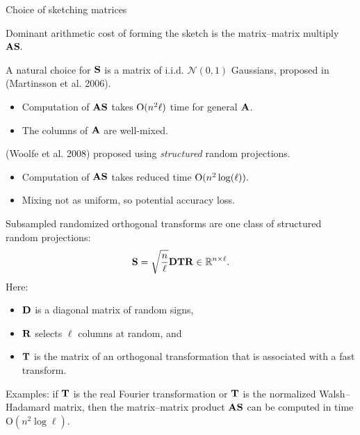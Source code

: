 \documentclass[xcolor=x11names,compress,ignorenonframetext,10pt]{beamer}
\renewcommand{\(}{\begin{columns}}
\renewcommand{\)}{\end{columns}}
\newcommand{\<}[1]{\begin{column}{#1}}
\renewcommand{\>}{\end{column}}
\def\refcolor{DodgerBlue4}
\newcommand{\refer}[1]{({\color{\refcolor}#1})}
\begin{document}
\begin{frame}{Choice of sketching matrices}

Dominant arithmetic cost of forming the sketch is the matrix--matrix multiply $\mathbf{A}\mathbf{S}.$
\vspace{1em}

A natural choice for $\mathbf{S}$ is a matrix of i.i.d. $\mathcal{N}(0,1)$ Gaussians, proposed in \refer{Martinsson et al. 2006}. 
\begin{itemize}
 \item Computation of 
$\mathbf{A} \mathbf{S}$ takes $\mathrm{O}(n^2\ell)$ time for general $\mathbf{A}$.
 \item The columns of $\mathbf{A}$ are well-mixed.
\end{itemize}

\vspace{1em}

\refer{Woolfe et al. 2008} proposed using \emph{structured} random projections.

\begin{itemize}
 \item Computation of $\mathbf{A} \mathbf{S}$ takes reduced time $\mathrm{O}(n^2 \log(\ell)).$
 \item Mixing not as uniform, so potential accuracy loss.
\end{itemize}

\end{frame}


\begin{frame}
 Subsampled randomized orthogonal transforms are one class of structured random projections:
 \[
  \mathbf{S} = \sqrt{\frac{n}{\ell}} \mathbf{D} \mathbf{T} \mathbf{R} \in \mathbb{R}^{n \times \ell}.
 \]
Here:
\begin{itemize}
 \item  $\mathbf{D}$ is a diagonal matrix of random signs,
 \item  $\mathbf{R}$ selects $\ell$ columns at random, and 
 \item $\mathbf{T}$ is the matrix of an orthogonal transformation that is associated with a fast transform.
\end{itemize}

Examples: if $\mathbf{T}$ is the real Fourier transformation or $\mathbf{T}$ is the normalized Walsh--Hadamard matrix, then
the matrix--matrix product $\mathbf{A} \mathbf{S}$ can be computed in time $\mathrm{O}(n^2\log\ell).$



\end{frame}
\end{document}
